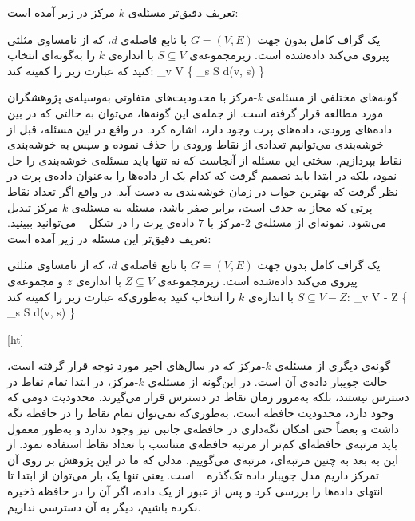 
تعریف دقیق‌تر مسئله‌ی $k$-مرکز در زیر آمده است:

 یک گراف کامل بدون جهت $G = (V, E)$ با تابع فاصله‌ی $d$، که از نامساوی مثلثی پیروی می‌کند داده‌شده است.
زیرمجموعه‌ی $S \subseteq V$ با اندازه‌ی $k$ را به‌گونه‌ای انتخاب کنید که عبارت زیر را کمینه کند:
\max_{v \in V} \{ \min_{s \in S} d(v, s) \}

گونه‌های مختلفی از مسئله‌ی $k$-مرکز با محدودیت‌های متفاوتی به‌وسیله‌ی پژوهشگران مورد مطالعه قرار گرفته است.
از جمله‌ی این گونه‌ها، می‌توان به حالتی که در بین داده‌های ورودی، داده‌های پرت وجود دارد، اشاره کرد.
در واقع در این مسئله، قبل از خوشه‌بندی می‌توانیم تعدادی از نقاط ورودی را حذف نموده و سپس به خوشه‌بندی نقاط بپردازیم.
سختی این مسئله از آنجاست که نه تنها باید مسئله‌ی خوشه‌بندی را حل نمود، بلکه در ابتدا باید تصمیم گرفت که کدام یک از داده‌ها را به‌عنوان داده‌ی پرت در نظر گرفت که بهترین جواب در زمان خوشه‌بندی به دست آید.
در واقع اگر تعداد نقاط پرتی که مجاز به حذف است، برابر صفر باشد، مسئله به مسئله‌ی $k$-مرکز تبدیل می‌شود.
نمونه‌ای از مسئله‌ی $2$-مرکز با $7$ داده‌ی پرت را در شکل ~ می‌توانید ببینید.
تعریف دقیق‌تر این مسئله در زیر آمده است:

 یک گراف کامل بدون جهت $G = (V, E)$ با تابع فاصله‌ی $d$، که از نامساوی مثلثی پیروی می‌کند داده‌شده است.
زیرمجموعه‌ی $Z \subseteq V$ با اندازه‌ی $z$ و  مجموعه‌ی $S \subseteq V - Z$ با اندازه‌ی $k$ را انتخاب کنید به‌طوری‌که عبارت زیر را کمینه کند:
\max_{v \in V - Z} \{ \min_{s \in S} d(v, s) \}

[ht]

گونه‌ی دیگری از مسئله‌ی $k$-مرکز که در سال‌های اخیر مورد توجه قرار گرفته است، حالت جویبار داده‌ی آن است.
در این‌گونه از مسئله‌ی $k$-مرکز، در ابتدا تمام نقاط در دسترس نیستند، بلکه به‌مرور زمان نقاط در دسترس قرار می‌گیرند.
محدودیت دومی که وجود دارد، محدودیت حافظه است، به‌طوری‌که نمی‌توان تمام نقاط را در حافظه نگه داشت و بعضاً حتی امکان نگه‌داری در حافظه‌ی جانبی نیز وجود ندارد و به‌طور معمول باید مرتبه‌ی حافظه‌ای کم‌تر از مرتبه حافظه‌ی  متناسب با تعداد نقاط استفاده نمود.
از این به بعد به چنین مرتبه‌ای، مرتبه‌ی  می‌گوییم.
مدلی که ما در این پژوهش بر روی آن تمرکز داریم مدل جویبار داده تک‌گذره ~ است.
یعنی تنها یک بار می‌توان از ابتدا تا انتهای داده‌ها را بررسی کرد و پس از عبور از یک داده، اگر آن را در حافظه ذخیره نکرده باشیم، دیگر به آن دسترسی نداریم.

